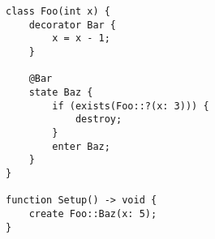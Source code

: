 \documentclass{minimal}
\begin{document}
\begin{verbatim}
class Foo(int x) {
    decorator Bar {
        x = x - 1;
    }

    @Bar
    state Baz {
        if (exists(Foo::?(x: 3))) {
            destroy;
        }
        enter Baz;
    }
}

function Setup() -> void {
    create Foo::Baz(x: 5);
}
\end{verbatim}
\end{document}
